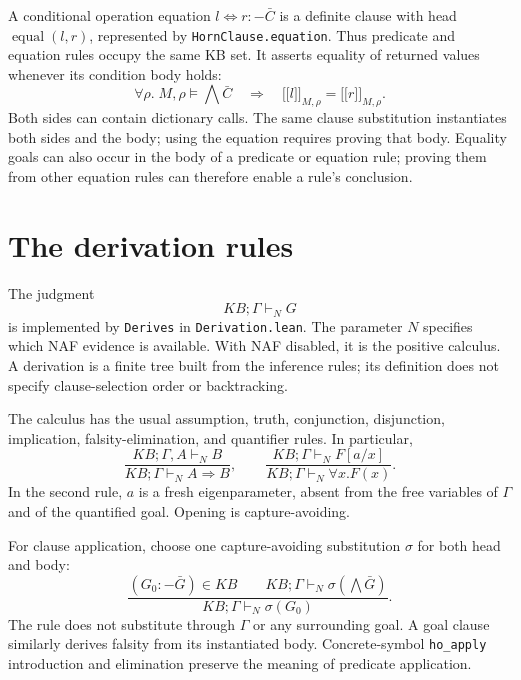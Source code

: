 \documentclass[11pt]{article}
\newcommand{\KB}{\mathit{KB}}
\begin{document}
A conditional operation equation $l\mathrel{\Leftrightarrow}r\mathbin{:-}\bar C$
is a definite clause with head $\operatorname{equal}(l,r)$, represented by
\texttt{HornClause.equation}. Thus predicate and equation rules occupy the same
KB set. It asserts equality of returned values whenever its condition body holds:
\[
 \forall\rho.\;M,\rho\models\bigwedge\bar C\quad\Longrightarrow\quad
 \lbrack\!\lbrack l\rbrack\!\rbrack_{M,\rho}
 =\lbrack\!\lbrack r\rbrack\!\rbrack_{M,\rho}.
\]
Both sides can contain dictionary calls. The same clause substitution
instantiates both sides and the body; using the equation requires proving that body.
Equality goals can also occur in the body of a predicate or equation rule;
proving them from other equation rules can therefore enable a rule's conclusion.

\section{The derivation rules}
The judgment
\[
 \KB;\Gamma\vdash_N G
\]
is implemented by \texttt{Derives} in \texttt{Derivation.lean}. The parameter
$N$ specifies which NAF evidence is available. With NAF disabled, it is the
positive calculus. A derivation is a finite tree built from the inference rules;
its definition does not specify clause-selection order or backtracking.

The calculus has the usual assumption, truth, conjunction, disjunction,
implication, falsity-elimination, and quantifier rules. In particular,
\[
 \frac{\KB;\Gamma,A\vdash_N B}{\KB;\Gamma\vdash_N A\Rightarrow B},
 \qquad
 \frac{\KB;\Gamma\vdash_N F[a/x]}{\KB;\Gamma\vdash_N\forall x.F(x)}.
\]
In the second rule, $a$ is a fresh eigenparameter, absent from the free variables
of $\Gamma$ and of the quantified goal. Opening is capture-avoiding.

For clause application, choose one capture-avoiding substitution $\sigma$ for
both head and body:
\[
 \frac{(G_0\mathbin{:-}\bar G)\in\KB\qquad
       \KB;\Gamma\vdash_N\sigma(\bigwedge\bar G)}
      {\KB;\Gamma\vdash_N\sigma(G_0)}.
\]
The rule does not substitute through $\Gamma$ or any surrounding goal. A goal
clause similarly derives falsity from its instantiated body. Concrete-symbol
\texttt{ho\_apply} introduction and elimination preserve the meaning of
predicate application.
\end{document}
